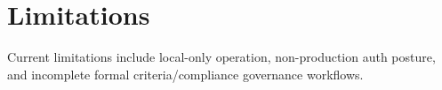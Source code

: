 \section{Limitations}
Current limitations include local-only operation, non-production auth posture, and incomplete formal criteria/compliance governance workflows.
